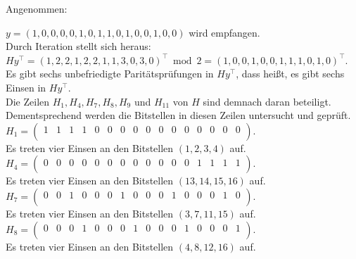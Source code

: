     \begin{Beispiel}
        Angenommen:
    
        $y = (1,0,0,0,0,1,0,1,1,0,1,0,0,1,0,0)$ wird empfangen.\\
        
        Durch Iteration stellt sich heraus:\\
        $Hy^\intercal= (1,2,2,1,2,2,1,1,3,0,3,0)^\intercal \bmod 2= (1,0,0,1,0,0,1,1,1,0,1,0)^\intercal.$\\
        
        Es gibt sechs unbefriedigte Paritätsprüfungen in $Hy^\intercal$,
        dass hei\ss{}t, es gibt sechs Einsen in $Hy^\intercal.$\\
        Die Zeilen $H_1, H_4, H_7, H_8, H_9$ und $H_{11}$ von $H$ sind demnach daran beteiligt.\\ 
        Dementsprechend werden die Bitstellen in diesen Zeilen untersucht und geprüft.\\
        
        $H_1= \left( \begin{array}{rrrrrrrrrrrrrrrr}
            1 & 1 & 1 & 1 & 0 & 0 & 0 & 0 & 0 & 0 & 0 & 0 & 0 & 0 & 0 & 0 \\
           \end{array}\right). 
        $\\
        Es treten vier Einsen an den Bitstellen $(1, 2, 3, 4)$ auf.\\
        
        $H_4= \left( \begin{array}{rrrrrrrrrrrrrrrr}
            0 & 0 & 0 & 0 & 0 & 0 & 0 & 0 & 0 & 0 & 0 & 0 & 1 & 1 & 1 & 1 \\
           \end{array}\right). 
        $\\
        Es treten vier Einsen an den Bitstellen $(13, 14, 15, 16)$ auf.\\
        
        $H_7= \left( \begin{array}{rrrrrrrrrrrrrrrr}
            0 & 0 & 1 & 0 & 0 & 0 & 1 & 0 & 0 & 0 & 1 & 0 & 0 & 0 & 1 & 0 \\
           \end{array}\right). 
        $\\
        Es treten vier Einsen an den Bitstellen $(3, 7, 11, 15)$ auf.\\
        
        $H_8= \left( \begin{array}{rrrrrrrrrrrrrrrr}
            0 & 0 & 0 & 1 & 0 & 0 & 0 & 1 & 0 & 0 & 0 & 1 & 0 & 0 & 0 & 1 \\
           \end{array}\right). 
        $\\
        Es treten vier Einsen an den Bitstellen $(4, 8, 12, 16)$ auf.\\
        

\end{Beispiel}
